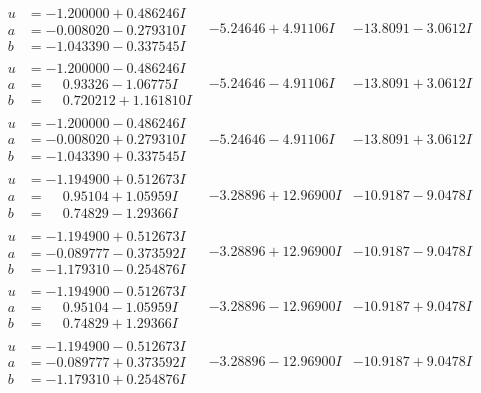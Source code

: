 \documentclass[1p]{elsarticle_modified}
\theoremstyle{definition}
\begin{document}
$$\begin{array}{c|c|c}
\begin{aligned}
u &= -1.200000 + 0.486246 I \\
a &= -0.008020 - 0.279310 I \\
b &= -1.043390 - 0.337545 I\end{aligned}
 & -5.24646 + 4.91106 I & -13.8091 - 3.0612 I \\ \hline\begin{aligned}
u &= -1.200000 - 0.486246 I \\
a &= \phantom{-}0.93326 - 1.06775 I \\
b &= \phantom{-}0.720212 + 1.161810 I\end{aligned}
 & -5.24646 - 4.91106 I & -13.8091 + 3.0612 I \\ \hline\begin{aligned}
u &= -1.200000 - 0.486246 I \\
a &= -0.008020 + 0.279310 I \\
b &= -1.043390 + 0.337545 I\end{aligned}
 & -5.24646 - 4.91106 I & -13.8091 + 3.0612 I \\ \hline\begin{aligned}
u &= -1.194900 + 0.512673 I \\
a &= \phantom{-}0.95104 + 1.05959 I \\
b &= \phantom{-}0.74829 - 1.29366 I\end{aligned}
 & -3.28896 + 12.96900 I & -10.9187 - 9.0478 I \\ \hline\begin{aligned}
u &= -1.194900 + 0.512673 I \\
a &= -0.089777 - 0.373592 I \\
b &= -1.179310 - 0.254876 I\end{aligned}
 & -3.28896 + 12.96900 I & -10.9187 - 9.0478 I \\ \hline\begin{aligned}
u &= -1.194900 - 0.512673 I \\
a &= \phantom{-}0.95104 - 1.05959 I \\
b &= \phantom{-}0.74829 + 1.29366 I\end{aligned}
 & -3.28896 - 12.96900 I & -10.9187 + 9.0478 I \\ \hline\begin{aligned}
u &= -1.194900 - 0.512673 I \\
a &= -0.089777 + 0.373592 I \\
b &= -1.179310 + 0.254876 I\end{aligned}
 & -3.28896 - 12.96900 I & -10.9187 + 9.0478 I\\

\end{array}$$
\end{document}
